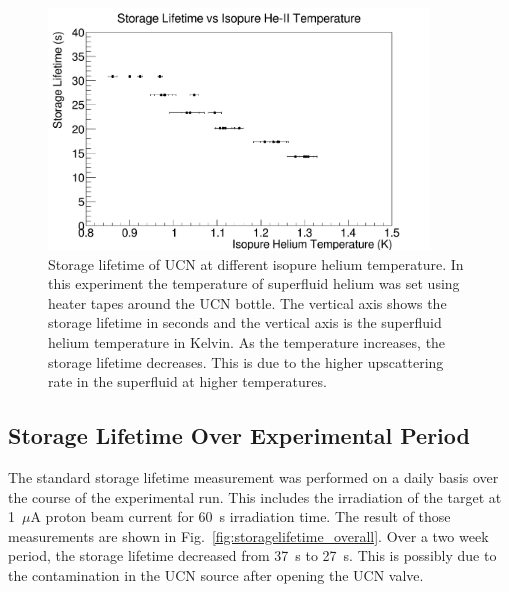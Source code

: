 \begin{figure}[h!]
  \centering
  \includegraphics[width=0.9\textwidth]{StorageLifetime_vs_temp.png}
  \caption{Storage lifetime of UCN at different isopure helium
    temperature. In this experiment the temperature of superfluid
    helium was set using heater tapes around the UCN bottle. The
    vertical axis shows the storage lifetime in seconds and the
    vertical axis is the superfluid helium temperature in Kelvin. As
    the temperature increases, the storage lifetime decreases. This is
    due to the higher upscattering rate in the superfluid at higher
    temperatures.}
  \label{fig:storagelifetime_vs_temp}
\end{figure}



\subsection{Storage Lifetime Over Experimental Period}

The standard storage lifetime measurement was performed on a daily
basis over the course of the experimental run. This includes the
irradiation of the target at 1~$\mu$A proton beam current for 60~s
irradiation time. The result of those measurements are shown in
Fig.~\ref{fig:storagelifetime_overall}. Over a two week period, the
storage lifetime decreased from 37~s to 27~s. This is possibly due to
the contamination in the UCN source after opening the UCN valve.



